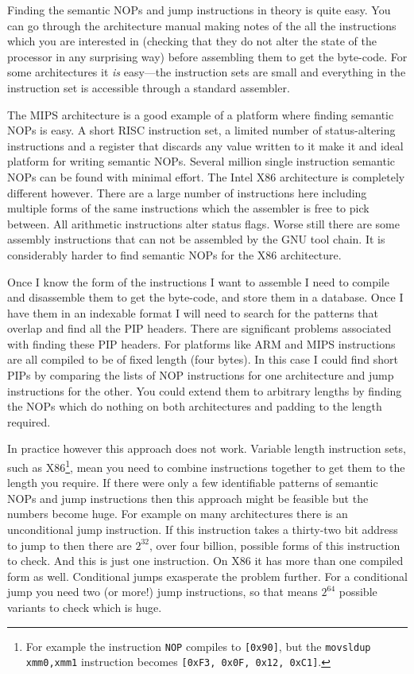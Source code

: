 \documentclass[10pt,]{book}
\begin{document}
Finding the semantic NOPs and jump instructions in theory is quite easy.
You can go through the architecture manual making notes of the all the
instructions which you are interested in (checking that they do not
alter the state of the processor in any surprising way) before
assembling them to get the byte-code. For some architectures it
\emph{is} easy---the instruction sets are small and everything in the
instruction set is accessible through a standard assembler.

The MIPS architecture\autocite{MIPSTechnologiesInc:2011ta} is a good
example of a platform where finding semantic NOPs is easy. A short RISC
instruction set, a limited number of status-altering instructions and a
register that discards any value written to it make it and ideal
platform for writing semantic NOPs. Several million single instruction
semantic NOPs can be found with minimal effort. The Intel X86
architecture\autocite{IntelCorporation:1997ta} is completely different
however. There are a large number of instructions here including
multiple forms of the same instructions which the assembler is free to
pick between. All arithmetic instructions alter status flags. Worse
still there are some assembly instructions that can not be assembled by
the GNU tool chain\autocite{Anonymous:td}. It is considerably harder to
find semantic NOPs for the X86 architecture.

Once I know the form of the instructions I want to assemble I need to
compile and disassemble them to get the byte-code, and store them in a
database. Once I have them in an indexable format I will need to search
for the patterns that overlap and find all the PIP headers. There are
significant problems associated with finding these PIP headers. For
platforms like ARM\autocite{Seal:2000vd} and
MIPS\autocite{MIPSTechnologiesInc:2011ta} instructions are all compiled
to be of fixed length (four bytes). In this case I could find short PIPs
by comparing the lists of NOP instructions for one architecture and jump
instructions for the other. You could extend them to arbitrary lengths
by finding the NOPs which do nothing on both architectures and padding
to the length required.

In practice however this approach does not work. Variable length
instruction sets, such as X86\footnote{For example the instruction
  \lstinline!NOP! compiles to \lstinline![0x90]!, but the
  \lstinline!movsldup xmm0,xmm1! instruction becomes
  \lstinline![0xF3, 0x0F, 0x12, 0xC1]!.}, mean you need to combine
instructions together to get them to the length you require. If there
were only a few identifiable patterns of semantic NOPs and jump
instructions then this approach might be feasible but the numbers become
huge. For example on many architectures there is an unconditional jump
instruction. If this instruction takes a thirty-two bit address to jump
to then there are $2^{32}$, over four billion, possible forms of this
instruction to check. And this is just one instruction. On X86 it has
more than one compiled form as well. Conditional jumps exasperate the
problem further. For a conditional jump you need two (or more!) jump
instructions, so that means $2^{64}$ possible variants to check which is
huge.
\end{document}
